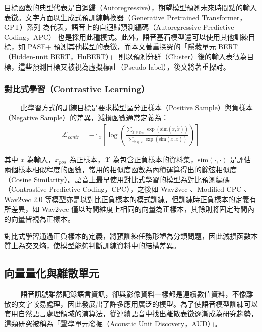 目標函數的典型代表是自迴歸（Autoregressive），期望模型預測未來時間點的輸入表徵。文字方面以生成式預訓練轉換器（Generative Pretrained Transformer，GPT）系列 \cite{radford_language_nodate, brown_language_2020}為代表，語音上的自迴歸預測編碼（Autoregressive Predictive Coding，APC） \cite{chung_generative_2020} 也是採用此種模式。此外，語音基石模型還可以使用其他訓練目標，如 PASE+ \cite{ravanelli_multi-task_2020} 預測其他模型的表徵，而本文著重探究的「隱藏單元 BERT（Hidden-unit BERT，HuBERT）」\cite{hsu_hubert_2021, hsu_hubert_2021-2} 則以預測分群（Cluster）後的輸入表徵為目標，這些預測目標又被視為虛擬標註（Pseudo-label），後文將著重探討。

\subsubsection{對比式學習（Contrastive Learning）}
　　
此學習方式的訓練目標是要求模型區分正樣本（Positive Sample）與負樣本（Negative Sample）的差異，減損函數通常定義為：
\begin{align}
    \mathcal{L}_{contr} = -\mathbb{E}_x\left[\log
        \left(
        {\frac
            {\sum_{\tilde{x} \in x_{pos}}\exp(\text{sim}(x, \tilde{x}))}
            {\sum_{\tilde{x} \in \mathcal{X}}\exp(\text{sim}(x, \tilde{x}))}
        }\right)\right]
\end{align}

其中 $x$ 為輸入，$x_{pos}$ 為正樣本，$\mathcal{X}$ 為包含正負樣本的資料集，$\text{sim}(\cdot, \cdot)$ 是評估兩個樣本相似程度的函數，常用的相似度函數為內積運算得出的餘弦相似度（Cosine Similarity）。語音上最早使用對比式學習的模型為對比預測編碼（Contrastive Predictive Coding，CPC）\cite{maekaku2022speech}，之後如 Wav2vec \cite{schneider2019wav2vec}、Modified CPC \cite{rivière2020unsupervised}、Wav2vec 2.0 \cite{baevski2020wav2vec} 等模型亦是以對比正負樣本的模式訓練，但訓練時正負樣本的定義有所差異，如 Wav2vec 僅以時間維度上相同的向量為正樣本，其餘則將固定時間內的向量皆視為正樣本。

對比式學習通過正負樣本的定義，將預訓練任務形塑為分類問題，因此減損函數本質上為交叉熵，使模型能夠判斷訓練資料中的結構差異。

\subsection{向量量化與離散單元}
　　
語音訊號雖然記錄語言資訊，卻與影像資料一樣都是連續數值資料，不像離散的文字較易處理，因此發展出了許多應用廣泛的模型。為了使語音模型訓練可以套用自然語言處理領域的演算法，從連續語音中找出離散表徵逐漸成為研究趨勢，這類研究被稱為「聲學單元發掘（Acoustic Unit Discovery，AUD）」。


